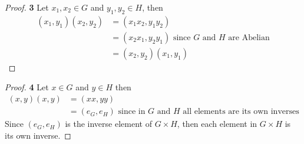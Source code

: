 \documentclass[11pt]{article}
\begin{document}
		\begin{proof}{\textbf{3}} Let $x_1,x_2 \in G$ and $y_1,y_2 \in H$, then
			\begin{align*}
				 (x_1, y_1)(x_2, y_2) & = (x_1x_2, y_1y_2) \\
					& = (x_2x_1, y_2y_1) \text{ since } G \text{ and } H \text{ are Abelian} \\
					& = (x_2,y_2)(x_1,y_1)
			\end{align*}
		\end{proof}
		\begin{proof}{\textbf{4}} Let $x \in G$ and $y \in H$ then
			\begin{align*}
				(x,y)(x,y) & = (xx,yy) \\
				 & = (e_G, e_H) \text{ since in } G \text{ and } H \text{ all elements are  its own inverses}			 
			\end{align*}
			Since $(e_G, e_H)$ is the inverse element of $G \times H$, then each element in $G \times H$ is its own inverse.
		\end{proof}
\cleardoublepage
\end{document}
